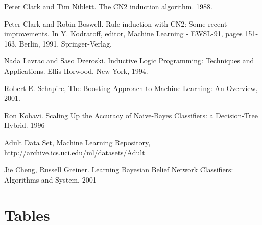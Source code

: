 \documentclass[a4paper]{llncs}
\begin{document}
\begin{thebibliography}{1}
Peter Clark and Tim Niblett. The CN2 induction algorithm. 1988.

Peter Clark and Robin Boswell. Rule induction with CN2: Some recent improvements. In Y. Kodratoff, editor, Machine Learning - EWSL-91, pages 151-163, Berlin, 1991. Springer-Verlag.

Nada Lavrac and Saso Dzeroski. Inductive Logic Programming: Techniques and Applications. Ellis Horwood, New York, 1994.

Robert E. Schapire, The Boosting Approach to Machine Learning: An Overview, 2001.

Ron Kohavi. Scaling Up the Accuracy of Naive-Bayes Classifiers: a Decision-Tree Hybrid. 1996

Adult Data Set, Machine Learning Repository, \url{http://archive.ics.uci.edu/ml/datasets/Adult}

Jie Cheng, Russell Greiner. Learning Bayesian Belief Network Classifiers: Algorithms and System. 2001

\end{thebibliography}

\clearpage

\appendix

\section{Tables}
\end{document}
